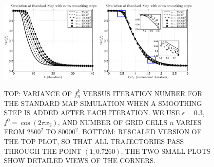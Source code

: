 \documentclass[twocolumn,10pt]{asme2e}
\begin{document}
\begin{figure}
      \includegraphics[width=0.45\textwidth]{standardmapcutoffwithsmoothing}
      \includegraphics[width=0.45\textwidth]{standardmapcutoffwithsmoothingn}
     \caption{\label{smoothingstandardmapun} TOP: VARIANCE OF $f_n^k$
       VERSUS ITERATION NUMBER FOR THE STANDARD MAP SIMULATION WHEN A
       SMOOTHING STEP IS ADDED AFTER EACH ITERATION. WE USE
       $\epsilon=0.3$, $f^0=\cos(2 \pi x_2)$, AND NUMBER OF GRID CELLS
       $n$ VARIES FROM $2500^2$ TO $80000^2$. BOTTOM: RESCALED VERSION
       OF THE TOP PLOT, SO THAT ALL TRAJECTORIES PASS THROUGH THE
       POINT $(1,0.7260)$. THE TWO SMALL PLOTS SHOW DETAILED VIEWS OF
       THE CORNERS.}
\end{figure}
\end{document}
